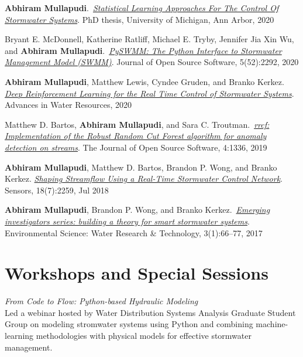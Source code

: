 \documentclass[a4paper,11pt]{article}
\newcommand{\years}[1]{%
  {\reversemarginpar\strut\marginnote{{\small#1}}}%
}
\begin{document}
\years{2020} \textbf{Abhiram Mullapudi}.\ \href{https://github.com/abhiramm7/UofM-Doc-Thesis/blob/master/Dissertation_Abhi.pdf}{\emph{Statistical Learning Approaches For The Control Of Stormwater Systems}}. PhD thesis, University of Michigan, Ann Arbor, 2020\\[.1cm]


\years{2020}  Bryant E. McDonnell, Katherine Ratliff, Michael E. Tryby, Jennifer Jia Xin Wu,
and \textbf{Abhiram Mullapudi}.\ \href{https://joss.theoj.org/papers/10.21105/joss.02292.pdf}{\emph{PySWMM: The Python Interface to Stormwater Management Model (SWMM)}}. Journal of Open Source Software, 5(52):2292, 2020\\[.1cm]


\years{2020}  \textbf{Abhiram Mullapudi}, Matthew Lewis, Cyndee Gruden, and Branko Kerkez.
\href{http://www.sciencedirect.com/science/article/pii/S0309170820302499}{\emph{Deep Reinforcement Learning for the Real Time Control of Stormwater Systems}}. Advances in Water Resources, 2020\\[.1cm]


\years{2019} Matthew D. Bartos, \textbf{Abhiram Mullapudi}, and Sara C. Troutman.\ \href{https://joss.theoj.org/papers/10.21105/joss.01336}{\emph{rrcf: Implementation of the Robust Random Cut Forest algorithm for anomaly detection on streams}}. The Journal of Open Source Software, 4:1336, 2019\\[.1cm]


\years{2018} \textbf{Abhiram Mullapudi}, Matthew D. Bartos, Brandon P. Wong, and Branko Kerkez.
\href{https://randomstorms.net/data/papers/shapingwater.pdf}{\emph{Shaping Streamflow Using a Real-Time Stormwater Control Network}}. Sensors, 18(7):2259, Jul 2018\\[.1cm]


\years{2017} \textbf{Abhiram Mullapudi}, Brandon P. Wong, and Branko Kerkez.\ \href{https://randomstorms.net/data/papers/stormwatertheory.pdf}{\emph{Emerging investigators series: building a theory for smart stormwater systems}}. Environmental Science: Water Research \& Technology, 3(1):66–77, 2017


\section*{Workshops and Special Sessions}
\years{2024} \emph{From Code to Flow: Python-based Hydraulic Modeling}\\[0.2cm]
Led a webinar hosted by Water Distribution Systems Analysis Graduate Student Group on modeling stromwater systems using Python and combining machine-learning methodologies with physical models for effective stormwater management.\\[.1cm]
\end{document}
